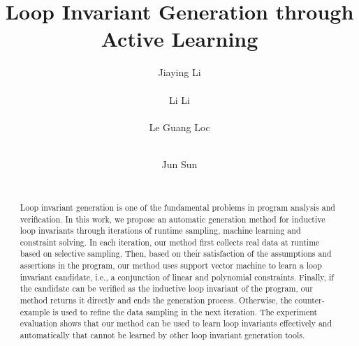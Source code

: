 \documentclass{sig-alternate-05-2015}
\begin{document}
\title{Loop Invariant Generation through Active Learning}


\author{
%
%
\alignauthor
Jiaying Li\\
       \\
\alignauthor
Li Li\\
       \\
\alignauthor 
Le Guang Loc\\
       \\
\and  %
\alignauthor 
Jun Sun\\
       \\
}

\maketitle

\begin{abstract}
	Loop invariant generation is one of the fundamental problems in program analysis and verification. 
    In this work, we propose an automatic generation method for inductive loop invariants 
    through iterations of runtime sampling, machine learning and constraint solving. 
    In each iteration, our method first collects real data at runtime based on selective sampling. 
    Then, based on their satisfaction of the assumptions and assertions in the program, 
    our method uses support vector machine to learn a loop invariant candidate, 
    i.e., a conjunction of linear and polynomial constraints. 
    Finally, if the candidate can be verified as the inductive loop invariant of the program, 
    our method returns it directly and ends the generation process. 
    Otherwise, the counter-example is used to refine the data sampling in the next iteration. 
    The experiment evaluation shows that our method can be used to learn loop invariants 
    effectively and automatically that cannot be learned by other loop invariant generation tools. 
\end{abstract}


% 









\end{document}
